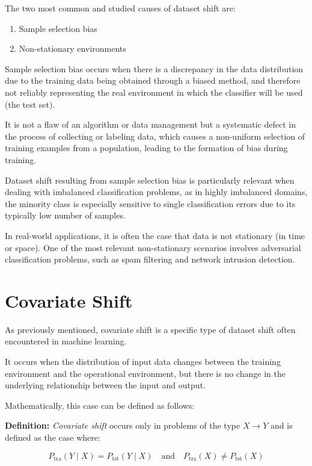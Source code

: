 The two most common and studied causes of dataset shift are:

\begin{enumerate}
	\item Sample selection bias
	\item Non-stationary environments
\end{enumerate}


Sample selection bias occurs when there is a discrepancy in the data distribution due to the training data being obtained through a biased method, and therefore not reliably representing the real environment in which the classifier will be used (the test set).

It is not a flaw of an algorithm or data management but a systematic defect in the process of collecting or labeling data, which causes a non-uniform selection of training examples from a population, leading to the formation of bias during training.

Dataset shift resulting from sample selection bias is particularly relevant when dealing with imbalanced classification problems, as in highly imbalanced domains, the minority class is especially sensitive to single classification errors due to its typically low number of samples.

In real-world applications, it is often the case that data is not stationary (in time or space). One of the most relevant non-stationary scenarios involves adversarial classification problems, such as spam filtering and network intrusion detection.
	

\section{Covariate Shift}

As previously mentioned, covariate shift is a specific type of dataset shift often encountered in machine learning.
	
It occurs when the distribution of input data changes between the training environment and the operational environment, but there is no change in the underlying relationship between the input and output.  
	
Mathematically, this case can be defined as follows:  
	
	\vspace{0.5cm}  
	\textbf{Definition:} \textit{Covariate shift} occurs only in problems of the type $X \to Y$ and is defined as the case where:  
	
	$$
	P_{\text{tra}}(Y \mid X) = P_{\text{tst}}(Y \mid X) \quad \text{and} \quad P_{\text{tra}}(X) \neq P_{\text{tst}}(X)
	$$

